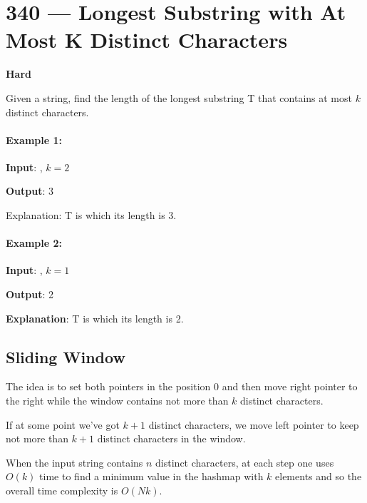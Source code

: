\section{340 --- Longest Substring with At Most K Distinct Characters}

\textbf{Hard}

Given a string, find the length of the longest substring T that contains at most $k$ distinct characters.

\paragraph{Example 1:}

\begin{flushleft}
\textbf{Input}: , $k = 2$

\textbf{Output}: 3

Explanation: T is  which its length is 3.
\end{flushleft}

\paragraph{Example 2:}

\begin{flushleft}
\textbf{Input}: , $k = 1$

\textbf{Output}: 2

\textbf{Explanation}: T is  which its length is 2.
\end{flushleft}

\subsection{Sliding Window}
The idea is to set both pointers in the position 0 and then move right pointer to the right while the window contains not more than $k$ distinct characters. 

If at some point we've got $k + 1$ distinct characters, we move left pointer to keep not more than $k + 1$ distinct characters in the window.

When the input string contains $n$ distinct characters, at each step one uses $O(k)$ time to find a minimum value in the hashmap with $k$ elements and so the overall time complexity is $O(Nk)$.

